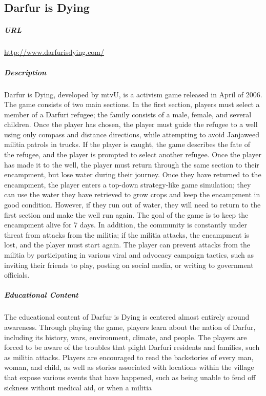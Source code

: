 \subsection{Darfur is Dying}\subparagraph{URL}\url{http://www.darfurisdying.com/}\subparagraph{Description}Darfur is Dying, developed by mtvU, is a activism game released in April of 2006. The game consists of two main sections. In the first section, players must select a member of a Darfuri refugee; the family consists of a male, female, and several children. Once the player has chosen, the player must guide the refugee to a well using only compass and distance directions, while attempting to avoid Janjaweed militia patrols in trucks. If the player is caught, the game describes the fate of the refugee, and the player is prompted to select another refugee. Once the player has made it to the well, the player must return through the same section to their encampment, but lose water during their journey. Once they have returned to the encampment, the player enters a top-down strategy-like game simulation; they can use the water they have retrieved to grow crops and keep the encampment in good condition. However, if they run out of water, they will need to return to the first section and make the well run again. The goal of the game is to keep the encampment alive for 7 days. In addition, the community is constantly under threat from attacks from the militia; if the militia attacks, the encampment is lost, and the player must start again. The player can prevent attacks from the militia by participating in various viral and advocacy campaign tactics, such as inviting their friends to play, posting on social media, or writing to government officials.\subparagraph{Educational Content}The educational content of Darfur is Dying is centered almost entirely around awareness. Through playing the game, players learn about the nation of Darfur, including its history, wars, environment, climate, and people. The players are forced to be aware of the troubles that plight Darfuri residents and families, such as militia attacks. Players are encouraged to read the backstories of every man, woman, and child, as well as stories associated with locations within the village that expose various events that have happened, such as being unable to fend off sickness without medical aid, or when a militia 